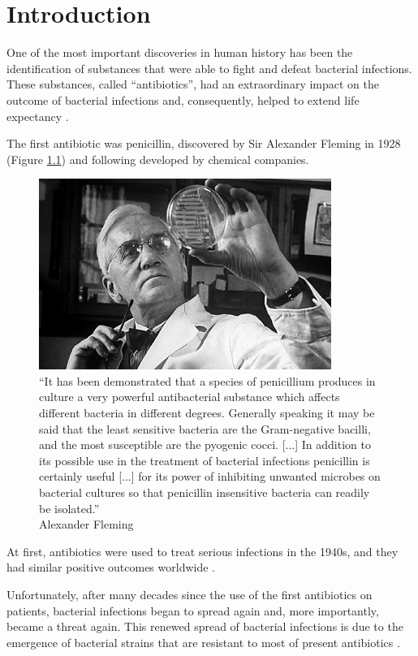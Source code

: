 \documentclass[11pt]{report}
\begin{document}
\tableofcontents

\chapter{Introduction}
One of the most important discoveries in human history has been the identification of substances that were able to fight and defeat bacterial infections.
These substances, called ``antibiotics'', had an extraordinary impact on the outcome of bacterial infections and, consequently, helped to extend life expectancy \cite{ventola2015antibiotic}.

The first antibiotic was penicillin, discovered by Sir Alexander Fleming in 1928 (Figure \ref{fleming}) and following developed by chemical companies.

\begin{figure}[htp]
\centering
\includegraphics[scale=1.10]{img/fleming.jpg}
\caption{``It has been demonstrated that a species of penicillium produces in culture a very powerful antibacterial substance which affects different bacteria in different degrees. Generally speaking it may be said that the least sensitive bacteria are the Gram-negative bacilli, and the most susceptible are the pyogenic cocci. [...]
In addition to its possible use in the treatment of bacterial infections penicillin is certainly useful [...] for its power of inhibiting unwanted microbes on bacterial cultures so that penicillin insensitive bacteria can readily be isolated.''\\
Alexander Fleming}
\label{fleming}
\end{figure}

\clearpage
At first, antibiotics were used to treat serious infections in the 1940s, and they had similar positive outcomes worldwide \cite{Spellberg2014}.

Unfortunately, after many decades since the use of the first antibiotics on patients, bacterial infections began to spread again and, more importantly, became a threat again.
This renewed spread of bacterial infections is due to the emergence of bacterial strains that are resistant to most of present antibiotics \cite{ventola2015antibiotic}.
\end{document}
